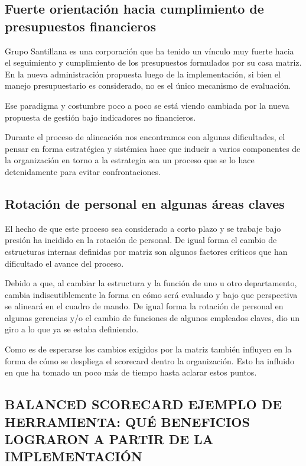 \subsection{Fuerte orientación hacia cumplimiento de presupuestos financieros}
\item {Grupo Santillana es una corporación que ha tenido un vínculo muy fuerte hacia el seguimiento y cumplimiento de los presupuestos formulados por su casa matriz. En la nueva administración propuesta luego de la implementación, si bien el manejo presupuestario es considerado, no es el único mecanismo de evaluación.

Ese paradigma y costumbre poco a poco se está viendo cambiada por la nueva propuesta de gestión bajo indicadores no financieros.

Durante el proceso de alineación nos encontramos con algunas dificultades, el pensar en forma estratégica y sistémica hace que inducir a varios componentes de la organización en torno a la estrategia sea un proceso que se lo hace detenidamente para evitar confrontaciones.}

\subsection{Rotación de personal en algunas áreas claves}
\item {El hecho de que este proceso sea considerado a corto plazo y se trabaje bajo presión ha incidido en la rotación de personal. De igual forma el cambio de estructuras internas definidas por matriz son algunos factores críticos que han dificultado el avance del proceso.

Debido a que, al cambiar la estructura y la función de uno u otro departamento, cambia indiscutiblemente la forma en cómo será evaluado y bajo que perspectiva se alineará en el cuadro de mando. De igual forma la rotación de personal en algunas gerencias y/o el cambio de funciones de algunos empleados claves, dio un giro a lo que ya se estaba definiendo.

Como es de esperarse los cambios exigidos por la matriz también influyen en la forma de cómo se despliega el scorecard dentro la organización. Esto ha influido en que ha tomado un poco más de tiempo hasta aclarar estos puntos.}




\begin{center}
\vspace*{0.1in}
\begin{Large}
\section{BALANCED SCORECARD EJEMPLO DE HERRAMIENTA: QUÉ BENEFICIOS LOGRARON A PARTIR DE LA IMPLEMENTACIÓN} \\
\end{Large}
\end{center}

